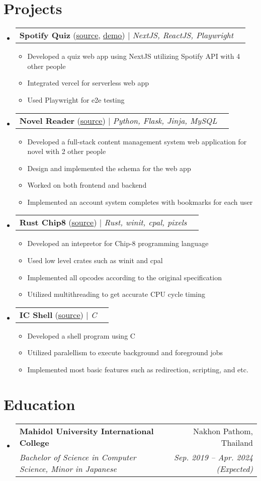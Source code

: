 \documentclass[letterpaper,11pt]{article}
\makeatletter
\newcommand{\resumeItem}[1]{
  \item\small{
    {#1 \vspace{-2pt}}
  }
}
\newcommand{\resumeSubheading}[4]{
  \vspace{-2pt}\item
    \begin{tabular*}{0.97\textwidth}[t]{l@{\extracolsep{\fill}}r}
      \textbf{#1} & #2 \\
      \textit{\small#3} & \textit{\small #4} \\
    \end{tabular*}\vspace{-7pt}
}
\newcommand{\resumeProjectHeading}[2]{
    \item
    \begin{tabular*}{0.97\textwidth}{l@{\extracolsep{\fill}}r}
      \small#1 & #2 \\
    \end{tabular*}\vspace{-7pt}
}
\newcommand{\resumeSubHeadingListStart}{\begin{itemize}[leftmargin=0.15in, label={}]}
\newcommand{\resumeSubHeadingListEnd}{\end{itemize}}
\newcommand{\resumeItemListStart}{\begin{itemize}}
\newcommand{\resumeItemListEnd}{\end{itemize}\vspace{-5pt}}
\makeatother
\begin{document}
\section{Projects}
    \resumeSubHeadingListStart
      \resumeProjectHeading
        {\textbf{Spotify Quiz} (\href{https://github.com/spotify-quiz/spotify-quiz}{\underline{source}}, \href{https://spotify-quiz-silk.vercel.app/}{\underline{demo}}) $|$ \emph{NextJS, ReactJS, Playwright}}{}
        \resumeItemListStart
          \resumeItem{Developed a quiz web app using NextJS utilizing Spotify API with 4 other people}
          \resumeItem{Integrated vercel for serverless web app}
          \resumeItem{Used Playwright for e2e testing}
        \resumeItemListEnd
      \resumeProjectHeading
        {\textbf{Novel Reader} (\href{https://github.com/fordkuppp/novel-reader}{\underline{source}}) $|$ \emph{Python, Flask, Jinja, MySQL}}{}
        \resumeItemListStart
          \resumeItem{Developed a full-stack content management system web application for novel with 2 other people}
          \resumeItem{Design and implemented the schema for the web app}
          \resumeItem{Worked on both frontend and backend}
          \resumeItem{Implemented an account system completes with bookmarks for each user}
        \resumeItemListEnd
      \resumeProjectHeading
          {\textbf{Rust Chip8} (\href{https://github.com/fordkuppp/rust-chip8}{\underline{source}}) $|$ \emph{Rust, winit, cpal, pixels}}{}
          \resumeItemListStart
            \resumeItem{Developed an intepretor for Chip-8 programming language}
            \resumeItem{Used low level crates such as winit and cpal}
            \resumeItem{Implemented all opcodes according to the original specification}
            \resumeItem{Utilized multithreading to get accurate CPU cycle timing}
          \resumeItemListEnd
      \resumeProjectHeading
          {\textbf{IC Shell} (\href{https://github.com/fordkuppp/icsh}{\underline{source}}) $|$ \emph{C}}{}
          \resumeItemListStart
            \resumeItem{Developed a shell program using C }
            \resumeItem{Utilized paralellism to execute background and foreground jobs }
            \resumeItem{Implemented most basic features such as redirection, scripting, and etc. }
          \resumeItemListEnd
    \resumeSubHeadingListEnd

\section{Education}
  \resumeSubHeadingListStart
    \resumeSubheading
      {Mahidol University International College}{Nakhon Pathom, Thailand}
      {Bachelor of Science in Computer Science, Minor in Japanese}{Sep. 2019 -- Apr. 2024 (Expected)}
  \resumeSubHeadingListEnd
\end{document}
